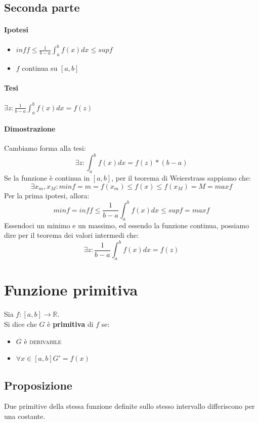 \documentclass{article}
\newcommand{\intab}{\int_a^b}
\begin{document}
\subsection{Seconda parte}

\paragraph{Ipotesi}
\begin{itemize}
\item \(inf f \leq \frac{1}{b - a} \int_a^b f(x) dx \leq sup f\)
\item \(f\) continua su \([a, b]\)
\end{itemize}

\paragraph{Tesi}
\(\exists z : \frac{1}{b - a} \int_a^b f(x) dx = f(z)\)

\paragraph{Dimostrazione}
Cambiamo forma alla tesi:
\[\exists z : \intab f(x) dx = f(z) * (b - a)\]
Se la funzione è continua in \([a, b]\), per il teorema di Weierstrass sappiamo che:
\[\exists x_m, x_M : min f = m = f(x_m) \leq f(x) \leq f(x_M) = M = max f\]
Per la prima ipotesi, allora:
\[min f = inf f \leq \frac{1}{b - a} \intab f(x) dx \leq sup f = max f\]
Essendoci un minimo e un massimo, ed essendo la funzione continua, possiamo dire per il teorema dei valori intermedi che:
\[\exists z : \frac{1}{b - a} \int_a^b f(x) dx = f(z)\]

\section{Funzione primitiva}
Sia \(f : [a, b] \to \mathbb{R}\).\\
Si dice che \(G\) è \textbf{primitiva} di \(f\) se:
\begin{itemize}
\item \(G\) è \textsc{derivabile}
\item \(\forall x \in [a, b] G' = f(x)\)
\end{itemize}

\subsection{Proposizione}
Due primitive della stessa funzione definite sullo stesso intervallo differiscono per una costante.
\end{document}
